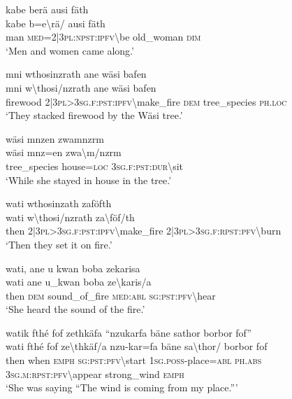 \ea\label{ex:8:a1829}
kabe berä ausi fäth\\
\gll kabe	b=e{\textbackslash}rä/	ausi	fäth\\
     man	\textsc{med}=2|3\textsc{pl}:\textsc{npst}:\textsc{ipfv}{\textbackslash}be	old\_woman	\textsc{dim}\\
\glt `Men and women came along.'
\z

\ea\label{ex:8:a1830}
mni wthosinzrath ane wäsi bafen\\
\gll mni	w{\textbackslash}thosi/nzrath	ane	wäsi	bafen\\
     firewood	2|3\textsc{pl}>3\textsc{sg}.\textsc{f}:\textsc{pst}:\textsc{ipfv}{\textbackslash}make\_fire	\textsc{dem}	tree\_species	\textsc{ph}.\textsc{loc}\\
\glt `They stacked firewood by the Wäsi tree.'
\z

\ea\label{ex:8:a1831}
wäsi mnzen zwamnzrm\\
\gll wäsi	mnz=en	zwa{\textbackslash}m/nzrm\\
     tree\_species	house=\textsc{loc}	3\textsc{sg}.\textsc{f}:\textsc{pst}:\textsc{dur}{\textbackslash}sit\\
\glt `While she stayed in house in the tree.'
\z

\ea\label{ex:8:a1832}
wati wthosinzath zaföfth\\
\gll wati	w{\textbackslash}thosi/nzrath	za{\textbackslash}föf/th\\
     then	2|3\textsc{pl}>3\textsc{sg}.\textsc{f}:\textsc{pst}:\textsc{ipfv}{\textbackslash}make\_fire	2|3\textsc{pl}>3\textsc{sg}.\textsc{f}:\textsc{rpst}:\textsc{pfv}{\textbackslash}burn\\
\glt `Then they set it on fire.'
\z

\ea\label{ex:8:a1833}
wati, ane u kwan boba zekarisa\\
\gll wati	ane	u\_kwan	boba	ze{\textbackslash}karis/a\\
     then	\textsc{dem}	sound\_of\_fire	\textsc{med}:\textsc{abl}	\textsc{sg}:\textsc{pst}:\textsc{pfv}{\textbackslash}hear\\
\glt `She heard the sound of the fire.'
\z

\ea\label{ex:8:a1834}
watik fthé fof zethkäfa ``nzukarfa bäne sathor borbor fof''\\
\gll wati	fthé	fof	ze{\textbackslash}thkäf/a	nzu-kar=fa	bäne	sa{\textbackslash}thor/	borbor	fof\\
     then	when	\textsc{emph}	\textsc{sg}:\textsc{pst}:\textsc{pfv}{\textbackslash}start	1\textsc{sg}.\textsc{poss}-place=\textsc{abl}	\textsc{ph}.\textsc{abs}	3\textsc{sg}.\textsc{m}:\textsc{rpst}:\textsc{pfv}{\textbackslash}appear	strong\_wind	\textsc{emph}\\
\glt `She was saying ``The wind is coming from my place.'''
\z

